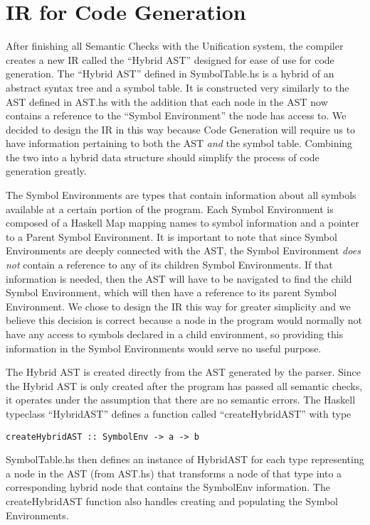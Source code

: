\documentclass[11pt]{article}
\begin{document}
\section{IR for Code Generation}
\label{sec:ir}

After finishing all Semantic Checks with the Unification system, the compiler 
creates a new IR called the ``Hybrid AST'' designed for ease of use for code 
generation. The ``Hybrid AST'' defined in SymbolTable.hs is a hybrid of an 
abstract syntax tree and a symbol table. It is constructed very similarly to 
the AST defined in AST.hs with the addition that each node in the AST now 
contains a reference to the ``Symbol Environment''  the node has access to. We 
decided to design the IR in this way because Code Generation will require us to 
have information pertaining to both the AST \emph{and} the symbol table.  
Combining the two into a hybrid data structure should simplify the process of 
code generation greatly.

The Symbol Environments are types that contain information about all symbols 
available at a certain portion of the program. Each Symbol Environment is 
composed of a Haskell Map mapping names to symbol information and a pointer to 
a Parent Symbol Environment. It is important to note that since Symbol 
Environments are deeply connected with the AST, the Symbol Environment 
\emph{does not} contain a reference to any of its children Symbol Environments.  
If that information is needed, then the AST will have to be navigated to find 
the child Symbol Environment, which will then have a reference to its parent 
Symbol Environment. We chose to design the IR this way for greater simplicity 
and we believe this decision is correct because a node in the program would 
normally not have any access to symbols declared in a child environment, so 
providing this information in the Symbol Environments would serve no useful 
purpose.  

The Hybrid AST is created directly from the AST generated by the parser. Since 
the Hybrid AST is only created after the program has passed all semantic 
checks, it operates under the assumption that there are no semantic errors. The 
Haskell typeclass ``HybridAST'' defines a function called ``createHybridAST'' 
with type \begin{verbatim}
createHybridAST :: SymbolEnv -> a -> b
\end{verbatim} 

SymbolTable.hs then defines an instance of HybridAST for each type representing 
a node in the AST (from AST.hs) that transforms a node of that type into a 
corresponding hybrid node that contains the SymbolEnv information. The 
createHybridAST function also handles creating and populating the Symbol 
Environments.
\end{document}
